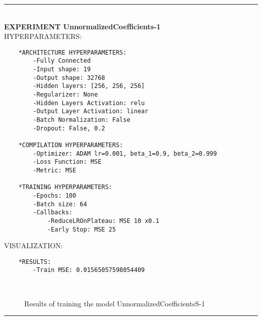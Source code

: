 \rule{0.5\textwidth}{0.5pt}\\

	{\large \textbf{EXPERIMENT UnnormalizedCoefficients-1}}\\
	
	{\normalsize HYPERPARAMETERS:}
	\begin{lstlisting}
	*ARCHITECTURE HYPERPARAMETERS:
		-Fully Connected
		-Input shape: 19
		-Output shape: 32768
		-Hidden layers: [256, 256, 256]
		-Regularizer: None
		-Hidden Layers Activation: relu
		-Output Layer Activation: linear
		-Batch Normalization: False
		-Dropout: False, 0.2
	
	*COMPILATION HYPERPARAMETERS:
		-Optimizer: ADAM lr=0.001, beta_1=0.9, beta_2=0.999
		-Loss Function: MSE
		-Metric: MSE
	
	*TRAINING HYPERPARAMETERS:
		-Epochs: 100
		-Batch size: 64
		-Callbacks: 
			-ReduceLROnPlateau: MSE 10 x0.1
			-Early Stop: MSE 25
	\end{lstlisting}
	
	{\normalsize VISUALIZATION:}
	\begin{lstlisting}
    *RESULTS:
        -Train MSE: 0.01565057598054409
	\end{lstlisting}
	
	\begin{figure*}[ht!]
		\hspace{\fill}
		\hspace{\fill}	
		\\
		\caption{Results of training the model UnnormalizedCoefficientsS-1}
	\end{figure*}
	
\FloatBarrier	
\rule{0.5\textwidth}{0.5pt}\\